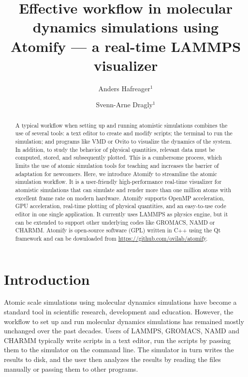 \documentclass[12pt,a4paper,final]{iopart}
\begin{document}
\title{Effective workflow in molecular dynamics simulations using Atomify --- a real-time LAMMPS visualizer}

\author[cor1]{Anders Hafreager$^{1}$}

\author{Svenn-Arne Dragly$^{1}$}
\address{$^1$Department of Physics - University of Oslo\\Sem S{\ae}lands vei 24, NO-0316, Oslo, Norway}

\begin{abstract}
A typical workflow when setting up and running atomistic simulations combines the use of several tools:
a text editor to create and modify scripts; the terminal to run the simulation; and programs like VMD or Ovito to visualize the dynamics of the system. In addition, to study the behavior of physical quantities, relevant data must be computed, stored, and subsequently plotted. This is a cumbersome process, which limits the use of atomic simulation tools for teaching and increases the barrier of adaptation for newcomers. 
Here, we introduce Atomify to streamline the atomic simulation workflow. It is a user-friendly high-performance real-time visualizer for atomistic simulations that can simulate and render more than one million atoms with excellent frame rate on modern hardware.
Atomify supports OpenMP acceleration, GPU acceleration, real-time plotting of physical quantities, and an easy-to-use code editor in one single application.
It currently uses LAMMPS as physics engine, but it can be extended to support other underlying codes like GROMACS, NAMD or CHARMM.
Atomify is open-source software (GPL) written in C++ using the Qt framework and can be downloaded from \url{https://github.com/ovilab/atomify}.
\end{abstract}

\vspace{2pc}

\section{Introduction}
Atomic scale simulations using molecular dynamics simulations have become a standard tool in scientific research, development and education\cite{frenkel2001understanding,StatisticalAndThermalPhysics-Gould-2006}.
However, the workflow to set up and run molecular dynamics simulations has remained mostly unchanged over the past decades.
Users of LAMMPS\cite{Plimpton1995Fast}, GROMACS\cite{berendsen1995gromacs}, NAMD\cite{nelson1996namd} and CHARMM\cite{brooks2009charmm} typically write
scripts in a text editor, run the scripts by passing them to the simulator on the command line. 
The simulator in turn writes the results to disk, and the user then analyzes the results
by reading the files manually or passing them to other programs.
\end{document}
